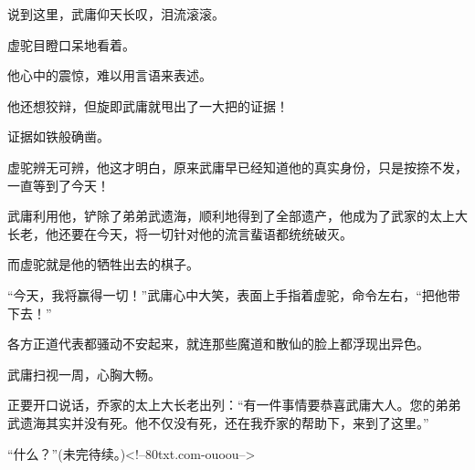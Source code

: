 \begin{this_body}
说到这里，武庸仰天长叹，泪流滚滚。

虚驼目瞪口呆地看着。

他心中的震惊，难以用言语来表述。

他还想狡辩，但旋即武庸就甩出了一大把的证据！

证据如铁般确凿。

虚驼辨无可辨，他这才明白，原来武庸早已经知道他的真实身份，只是按捺不发，一直等到了今天！

武庸利用他，铲除了弟弟武遗海，顺利地得到了全部遗产，他成为了武家的太上大长老，他还要在今天，将一切针对他的流言蜚语都统统破灭。

而虚驼就是他的牺牲出去的棋子。

“今天，我将赢得一切！”武庸心中大笑，表面上手指着虚驼，命令左右，“把他带下去！”

各方正道代表都骚动不安起来，就连那些魔道和散仙的脸上都浮现出异色。

武庸扫视一周，心胸大畅。

正要开口说话，乔家的太上大长老出列：“有一件事情要恭喜武庸大人。您的弟弟武遗海其实并没有死。他不仅没有死，还在我乔家的帮助下，来到了这里。”

“什么？”(未完待续。)<!--80txt.com-ouoou-->

\end{this_body}

